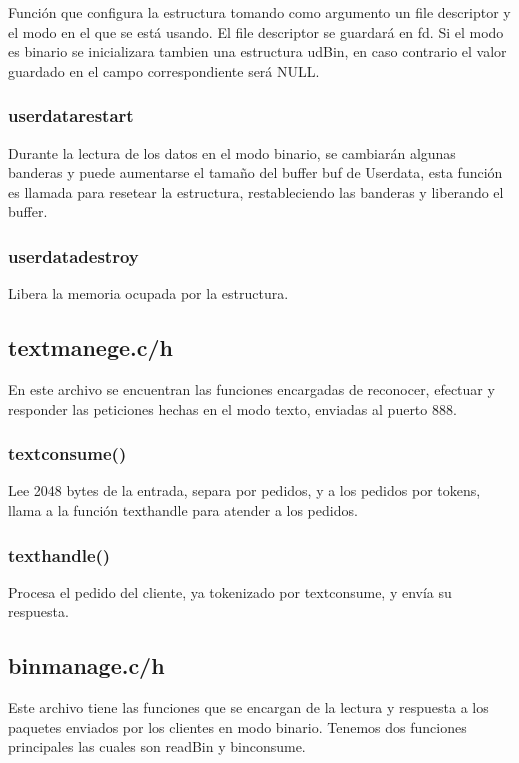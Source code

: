 \documentclass{article}
\begin{document}
Función que configura la estructura tomando como argumento un file descriptor y el modo en el que se está usando. El file descriptor se guardará en fd. Si el modo es binario se inicializara tambien una estructura udBin, en caso contrario el valor guardado en el campo correspondiente será NULL.

\subsubsection{user\textunderscore data\textunderscore restart}

Durante la lectura de los datos en el modo binario, se cambiarán algunas banderas y puede aumentarse el tamaño del buffer buf de User\textunderscore data, esta función es llamada para resetear la estructura, restableciendo las banderas y liberando el buffer.

\subsubsection{user\textunderscore data\textunderscore destroy}

Libera la memoria ocupada por la estructura.


\subsection{text\textunderscore manege.c/h}
En este archivo se encuentran las funciones encargadas de reconocer, efectuar y responder las peticiones hechas en el modo texto, enviadas al puerto 888.


\subsubsection{text\textunderscore consume()}
Lee 2048 bytes de la entrada, separa por pedidos, y a los pedidos por tokens, llama a la función text\textunderscore handle para atender a los pedidos.

\subsubsection{text\textunderscore handle()}
Procesa el pedido del cliente, ya tokenizado por text\textunderscore consume, y envía su respuesta.

\subsection{bin\textunderscore manage.c/h}\label{sec:bin}
Este archivo tiene las funciones que se encargan de la lectura
y respuesta a los paquetes enviados por los clientes en modo
binario. Tenemos dos funciones principales las cuales son
readBin y bin\textunderscore consume.
\end{document}
